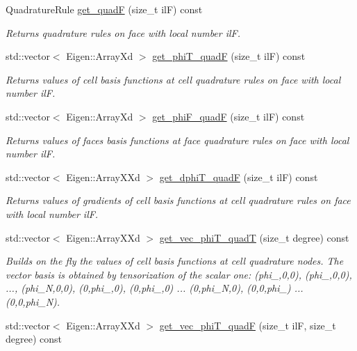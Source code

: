 \begin{DoxyCompactItemize}
Quadrature\+Rule \hyperlink{group__HybridCore_ga7eb693a2f8d58d04b0e653cb952e59f2}{get\+\_\+quadF} (size\+\_\+t ilF) const
\begin{DoxyCompactList}\small\item\em Returns quadrature rules on face with local number ilF. \end{DoxyCompactList}\item 
std\+::vector$<$ Eigen\+::\+Array\+Xd $>$ \hyperlink{group__HybridCore_gab6349fe3a8eb0d4070cd2bd82742bdcc}{get\+\_\+phi\+T\+\_\+quadF} (size\+\_\+t ilF) const
\begin{DoxyCompactList}\small\item\em Returns values of cell basis functions at cell quadrature rules on face with local number ilF. \end{DoxyCompactList}\item 
std\+::vector$<$ Eigen\+::\+Array\+Xd $>$ \hyperlink{group__HybridCore_gad9c2ba4cdbfda183ee00ab059d8885e5}{get\+\_\+phi\+F\+\_\+quadF} (size\+\_\+t ilF) const
\begin{DoxyCompactList}\small\item\em Returns values of faces basis functions at face quadrature rules on face with local number ilF. \end{DoxyCompactList}\item 
std\+::vector$<$ Eigen\+::\+Array\+X\+Xd $>$ \hyperlink{group__HybridCore_gabae2f4323f94acb5417ca82870790071}{get\+\_\+dphi\+T\+\_\+quadF} (size\+\_\+t ilF) const
\begin{DoxyCompactList}\small\item\em Returns values of gradients of cell basis functions at cell quadrature rules on face with local number ilF. \end{DoxyCompactList}\item 
std\+::vector$<$ Eigen\+::\+Array\+X\+Xd $>$ \hyperlink{classHArDCore3D_1_1ElementQuad_a0df097bcb15554c9f9ee752f04c14f95}{get\+\_\+vec\+\_\+phi\+T\+\_\+quadT} (size\+\_\+t degree) const
\begin{DoxyCompactList}\small\item\em Builds on the fly the values of cell basis functions at cell quadrature nodes. The vector basis is obtained by tensorization of the scalar one\+: (phi\+\_,0,0), (phi\+\_,0,0), ..., (phi\+\_\+N,0,0), (0,phi\+\_,0), (0,phi\+\_,0) ... (0,phi\+\_\+N,0), (0,0,phi\+\_) ... (0,0,phi\+\_\+N). \end{DoxyCompactList}\item 
std\+::vector$<$ Eigen\+::\+Array\+X\+Xd $>$ \hyperlink{classHArDCore3D_1_1ElementQuad_a318c36aca48d3cdb6b501d3d0e1554cf}{get\+\_\+vec\+\_\+phi\+T\+\_\+quadF} (size\+\_\+t ilF, size\+\_\+t degree) const

\end{DoxyCompactItemize}
